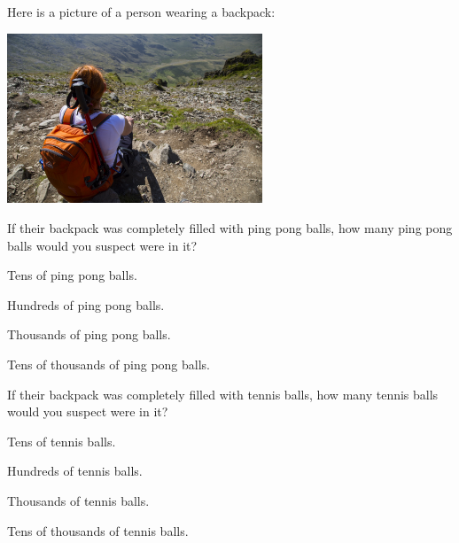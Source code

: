 \documentclass[handout,noauthor,nooutcomes]{ximera}
\author{Bart Snapp}
\begin{document}
\maketitle


\begin{exercise}
  Here is a picture of a person wearing a backpack:
  \begin{center}
    \includegraphics[width=3in]{backpack.jpg}
  \end{center}
  If their backpack was completely filled with ping pong balls, how
  many ping pong balls would you suspect were in it?
  \begin{enumerate}\begin{multicols}{2}
    \item Tens of ping pong balls.
    \item Hundreds of ping pong balls.
    \item Thousands of ping pong balls.
    \item Tens of thousands of ping pong balls. 
    \end{multicols}
  \end{enumerate}
\end{exercise}


\begin{exercise}
  If their backpack was completely filled with tennis balls, how many
  tennis balls would you suspect were in it?
  \begin{enumerate}\begin{multicols}{2}
    \item Tens of tennis balls.
    \item Hundreds of tennis balls.
    \item Thousands of tennis balls.
    \item Tens of thousands of tennis balls.
    \end{multicols}
  \end{enumerate}
\end{exercise}
  
\end{document}
